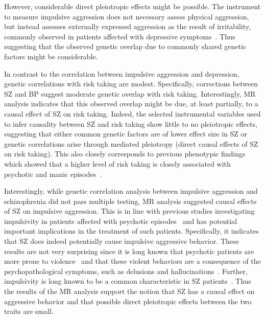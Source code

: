 However, considerable direct pleiotropic effects might be possible.
The  instrument to measure impulsive aggression does not necessary assess physical aggression, but instead assesses externally expressed aggression as the result of irritability,  commonly observed in patients affected with depressive symptoms~\cite{Dutton2013,Clark1994}.
Thus suggesting that the observed genetic overlap due to commonly shared genetic factors might be considerable.

In contrast to the correlation between impulsive aggression and depression, genetic correlations with risk taking are modest.
Specifically, corrections between SZ and BP suggest moderate genetic overlap with risk taking.
Interestingly, MR analysis indicates that this observed overlap might be due, at least partially, to a causal effect of SZ on risk taking.
Indeed, the selected instrumental variables used to infer causality between SZ and risk taking show little to no pleiotropic effects,
 suggesting that either common genetic factors are of lower effect size in SZ or genetic correlations arise through mediated pleiotropy (direct causal effects of SZ on risk taking). 
This also closely corresponds to previous phenotypic findings which showed that a higher level of risk taking is closely associated with psychotic and manic episodes~\cite{Johnson2012,APA1994,AmericanPsychiatricAssociation2013}.

Interestingly, while genetic correlation analysis between impulsive aggression and schizophrenia did not pass multiple testing, MR analysis suggested causal effects of SZ on impulsive aggression. 
This is in line with previous studies investigating impulsivity in patients affected with psychotic episodes~\cite{Ouzir2013} and has potential important implications in the treatment of such patients.
Specifically, it indicates that SZ does indeed potentially cause impulsive aggressive behavior.
These results are not very surprising since it is long known that psychotic patients are more prone to violence~\cite{Douglas2009} and that these violent behaviors are a consequence of the psychopathological symptoms, such as delusions and hallucinations~\cite{Swanson2006}.
Further, impulsivity is long known to be a common characteristic in SZ patients~\cite{Ouzir2013}.
Thus the results of the MR analysis support the notion that SZ has a causal effect on aggressive behavior and that possible direct pleiotropic effects between the two traits are small.

